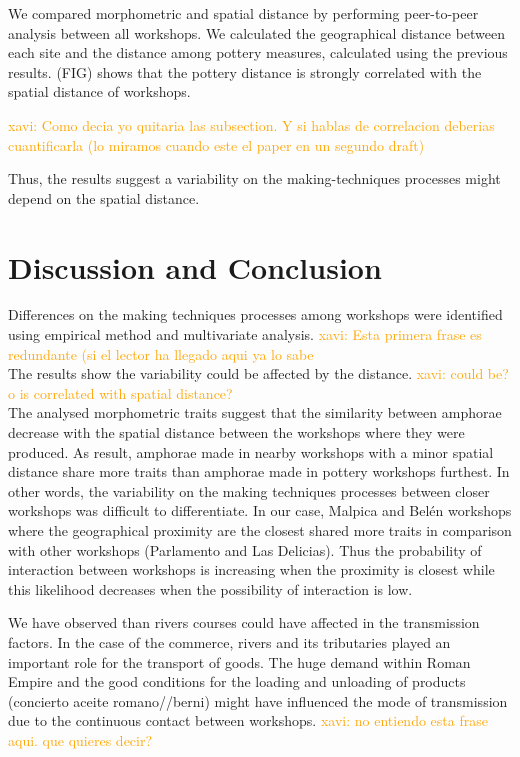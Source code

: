 \documentclass[review]{elsarticle}
\newcommand{\memo}[2]{\textcolor{#1}{#2}}
\newcommand{\xavi}[1]{\memo{orange}{xavi: #1\\}}
\begin{document}
We compared morphometric and spatial distance by performing peer-to-peer analysis between all workshops. We calculated the geographical distance between each site and the distance among pottery measures, calculated using the previous results. (FIG) shows that the pottery distance is strongly correlated with the spatial distance of workshops.


\xavi{Como decia yo quitaria las subsection. Y si hablas de correlacion deberias cuantificarla (lo miramos cuando este el paper en un segundo draft)}



Thus, the results suggest a variability on the making-techniques processes might depend on the spatial distance.  

\section{Discussion and Conclusion}


Differences on the making techniques processes among workshops were identified using empirical method and multivariate analysis. \xavi{Esta primera frase es redundante (si el lector ha llegado aqui ya lo sabe} The results show the variability could be affected by the distance. \xavi{could be? o is correlated with spatial distance?} The analysed morphometric traits suggest that the similarity between amphorae decrease with the spatial distance between the workshops where they were produced. As result, amphorae made in nearby workshops with a minor spatial distance share more traits than amphorae made in pottery workshops furthest. In other words, the variability on the making techniques processes between closer workshops was difficult to differentiate. In our case, Malpica and Bel\'en workshops where the geographical proximity are the closest shared more traits in comparison with other workshops (Parlamento and Las Delicias). Thus the probability of interaction between workshops is increasing when the proximity is closest while this likelihood decreases when the possibility of interaction is low. 

We have observed than rivers courses could have affected in the transmission factors. In the case of the commerce, rivers and its tributaries played an important role for the transport of goods. The huge demand within Roman Empire and the good conditions for the loading and unloading of products (concierto aceite romano//berni) might have influenced the mode of transmission due to the continuous contact between workshops. \xavi{no entiendo esta frase aqui. que quieres decir?} 
\end{document}
